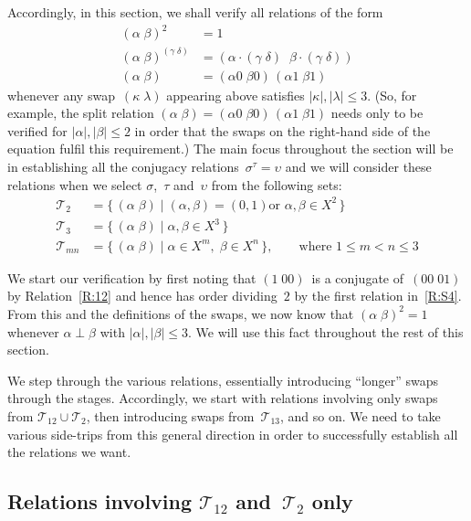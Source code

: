 \documentclass[a4paper,11pt]{article}
\numberwithin{equation}{section}
\newcommand{\length}[1]{\mathopen{|}#1\mathclose{|}}
\newcommand{\set}[2]{\{\,#1\mid#2\,\}}
\newcommand{\swap}[2]{(#1\;#2)}
\newcommand{\Sw}[1]{\mathcal{T}_{#1}}
\renewcommand{\leq}{\leqslant}
\begin{document}
Accordingly, in this section, we shall verify all relations of the
form
\begin{align*}
  \swap{\alpha}{\beta}^{2} &= 1 \\
  \swap{\alpha}{\beta}^{\swap{\gamma}{\delta}} &=
  \swap{\alpha\!\cdot\!\swap{\gamma}{\delta}\;}{\beta\!\cdot\!\swap{\gamma}{\delta}} \\
  \swap{\alpha}{\beta} &= \swap{\alpha0}{\beta0} \,
  \swap{\alpha1}{\beta1}
\end{align*}
whenever any swap~$\swap{\kappa}{\lambda}$ appearing above satisfies
$\length{\kappa},\length{\lambda} \leq 3$.  (So, for example, the
split relation $\swap{\alpha}{\beta} = \swap{\alpha0}{\beta0} \,
\swap{\alpha1}{\beta1}$ needs only to be verified for
$\length{\alpha},\length{\beta} \leq 2$ in order that the swaps on the
right-hand side of the equation fulfil this requirement.)  The main
focus throughout the section will be in establishing all the conjugacy
relations~$\sigma^{\tau} = \upsilon$ and we will consider these
relations when we select $\sigma$,~$\tau$ and~$\upsilon$ from the
following sets:
\begin{align*}
  \Sw{2} &= \set{\swap{\alpha}{\beta}}{\text{$(\alpha,\beta) = (0,1)$
      or $\alpha,\beta \in X^{2}$}} \\
  \Sw{3} &= \set{\swap{\alpha}{\beta}}{\alpha, \beta \in X^{3}} \\
  \Sw{mn} &= \set{\swap{\alpha}{\beta}}{\alpha \in X^{m}, \; \beta \in
    X^{n}}, \qquad \text{where $1 \leq m < n \leq 3$}
\end{align*}

We start our verification by first noting that $\swap{1}{00}$~is a
conjugate of~$\swap{00}{01}$ by Relation~\ref{R:12} and hence has
order dividing~$2$ by the first relation in~\ref{R:S4}.  From this and
the definitions of the swaps, we now know that
$\swap{\alpha}{\beta}^{2} = 1$ whenever $\alpha \perp \beta$ with
$\length{\alpha},\length{\beta} \leq 3$.  We will use this fact
throughout the rest of this section.

We step through the various relations, essentially introducing
``longer'' swaps through the stages.  Accordingly, we start with
relations involving only swaps from $\Sw{12} \cup \Sw{2}$, then
introducing swaps from~$\Sw{13}$, and so on.  We need to take various
side-trips from this general direction in order to successfully
establish all the relations we want.

\subsection{\boldmath Relations involving $\Sw{12}$ and~$\Sw{2}$ only}
\end{document}
